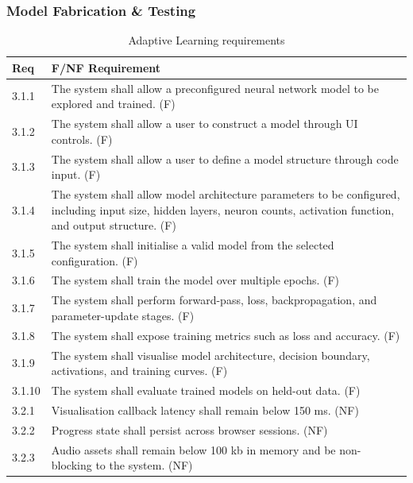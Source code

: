 \documentclass{article}
\begin{document}
\subsubsection{Model Fabrication \& Testing}
\begin{table}[H]
\centering
\begin{tabular}{|p{1cm}|p{12.5cm}|}
\hline
\textbf{Req} & \textbf{F/NF Requirement} \\
\hline
3.1.1 & The system shall allow a preconfigured neural network model to be explored and trained. (F) \\
\hline
3.1.2 & The system shall allow a user to construct a model through UI controls. (F) \\
\hline
3.1.3 & The system shall allow a user to define a model structure through code input. (F) \\
\hline
3.1.4 & The system shall allow model architecture parameters to be configured, including input size, hidden layers, neuron counts, activation function, and output structure. (F) \\
\hline
3.1.5 & The system shall initialise a valid model from the selected configuration. (F) \\
\hline
3.1.6 & The system shall train the model over multiple epochs. (F) \\
\hline
3.1.7 & The system shall perform forward-pass, loss, backpropagation, and parameter-update stages. (F) \\
\hline
3.1.8 & The system shall expose training metrics such as loss and accuracy. (F) \\
\hline
3.1.9 & The system shall visualise model architecture, decision boundary, activations, and training curves. (F) \\
\hline
3.1.10 & The system shall evaluate trained models on held-out data. (F) \\
\hline
3.2.1 & Visualisation callback latency shall remain below 150 ms. (NF) \\
\hline
3.2.2 & Progress state shall persist across browser sessions. (NF) \\
\hline
3.2.3 & Audio assets shall remain below 100 kb in memory and be non-blocking to the system. (NF) \\
\hline
\end{tabular}
\caption{Adaptive Learning requirements}
\end{table}
\end{document}
